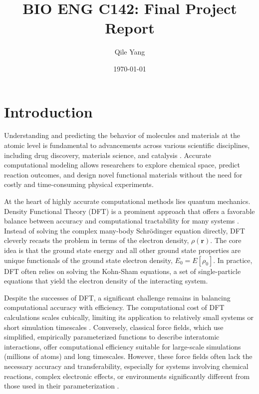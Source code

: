 \documentclass[11pt, twocolumn]{article}
\newcommand \myabstract[2][.8]{%
  \renewcommand\maketitlehookd{%
    \mbox{}\medskip\par
    \centering
    \begin{minipage}{#1\textwidth}
      #2
    \end{minipage}}}
\begin{document}
\author{Qile Yang}
\title{BIO ENG C142: Final Project Report}
\date{\today}
\myabstract{\lipsum[1]}
\maketitle

\section{Introduction}

Understanding and predicting the behavior of molecules and materials at the atomic level is fundamental to advancements across various scientific disciplines, including drug discovery, materials science, and catalysis \cite{wang2018silico, dominy2004native, cicaloni2019applications}. Accurate computational modeling allows researchers to explore chemical space, predict reaction outcomes, and design novel functional materials without the need for costly and time-consuming physical experiments.

At the heart of highly accurate computational methods lies quantum mechanics. Density Functional Theory (DFT) is a prominent approach that offers a favorable balance between accuracy and computational tractability for many systems \cite{engel2011density}. Instead of solving the complex many-body Schrödinger equation directly, DFT cleverly recasts the problem in terms of the electron density, $\rho(\mathbf{r})$. The core idea is that the ground state energy and all other ground state properties are unique functionals of the ground state electron density, $E_0 = E[\rho_0]$. In practice, DFT often relies on solving the Kohn-Sham equations, a set of single-particle equations that yield the electron density of the interacting system.

Despite the successes of DFT, a significant challenge remains in balancing computational accuracy with efficiency. The computational cost of DFT calculations scales cubically, limiting its application to relatively small systems or short simulation timescales \cite{engel2011density, cohen2012challenges}. Conversely, classical force fields, which use simplified, empirically parameterized functions to describe interatomic interactions, offer computational efficiency suitable for large-scale simulations (millions of atoms) and long timescales. However, these force fields often lack the necessary accuracy and transferability, especially for systems involving chemical reactions, complex electronic effects, or environments significantly different from those used in their parameterization \cite{herbers2013grand}.
\end{document}

